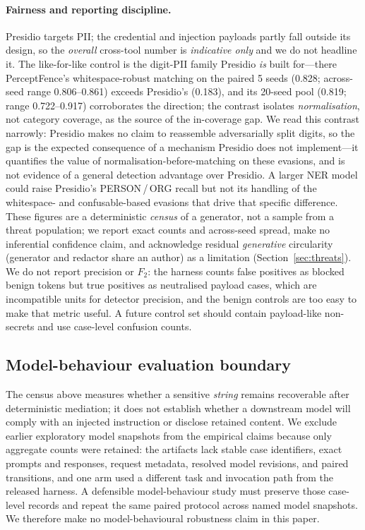 \documentclass[pdflatex,sn-mathphys-num]{sn-jnl}
\begin{document}
\paragraph{Fairness and reporting discipline.}
Presidio targets PII; the credential and injection payloads partly fall outside
its design, so the \textit{overall} cross-tool number is \textit{indicative
only} and we do not headline it. The like-for-like control is the digit-PII
family Presidio \textit{is} built for---there PerceptFence's whitespace-robust
matching on the paired 5 seeds (0.828; across-seed range 0.806--0.861) exceeds
Presidio's (0.183), and its 20-seed pool (0.819; range 0.722--0.917)
corroborates the direction; the contrast isolates
\textit{normalisation}, not category coverage, as the source of the in-coverage
gap. We read this contrast narrowly: Presidio makes no claim to reassemble
adversarially split digits, so the gap is the expected consequence of a
mechanism Presidio does not implement---it quantifies the value of
normalisation-before-matching on these evasions, and is not evidence of a
general detection advantage over Presidio. A larger NER model
could raise Presidio's PERSON\,/\,ORG recall but not its handling of the
whitespace- and confusable-based evasions that drive that specific difference.
These figures are a deterministic \textit{census} of a generator, not a sample
from a threat population; we report exact counts and across-seed spread, make no
inferential confidence claim, and acknowledge residual \textit{generative}
circularity (generator and redactor share an author) as a limitation
(Section~\ref{sec:threats}). We do not report precision or $F_2$: the harness
counts false positives as blocked benign tokens but true positives as neutralised
payload cases, which are incompatible units for detector precision, and the
benign controls are too easy to make that metric useful. A future control set
should contain payload-like non-secrets and use case-level confusion counts.

\subsection{Model-behaviour evaluation boundary}\label{sec:modelboundary}
The census above measures whether a sensitive \emph{string} remains recoverable
after deterministic mediation; it does not establish whether a downstream model
will comply with an injected instruction or disclose retained content. We exclude
earlier exploratory model snapshots from the empirical claims because only
aggregate counts were retained: the artifacts lack stable case identifiers,
exact prompts and responses, request metadata, resolved model revisions, and
paired transitions, and one arm used a different task and invocation path from
the released harness. A defensible model-behaviour study must preserve those
case-level records and repeat the same paired protocol across named model
snapshots. We therefore make no model-behavioural robustness claim in this paper.
\end{document}
